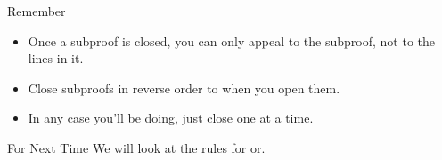 \documentclass[
  ignorenonframetext,
]{beamer}
\providecommand{\tightlist}{%
  \setlength{\itemsep}{0pt}\setlength{\parskip}{0pt}}
\renewcommand{\,}{\text{, }}
\begin{document}
\begin{frame}{Remember}
\protect\hypertarget{remember}{}
\begin{itemize}
\tightlist
\item
  Once a subproof is closed, you can only appeal to the subproof, not to
  the lines in it.
\item
  Close subproofs in reverse order to when you open them.
\item
  In any case you'll be doing, just close one at a time.
\end{itemize}
\end{frame}

\begin{frame}{For Next Time}
\protect\hypertarget{for-next-time}{}
We will look at the rules for or.
\end{frame}
\end{document}
